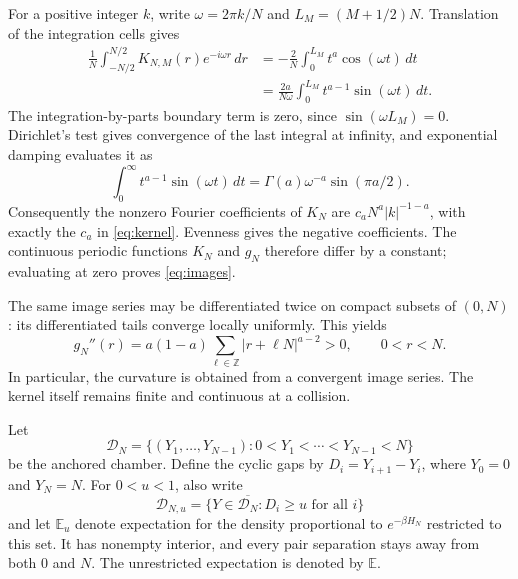 \documentclass[11pt]{article}
\theoremstyle{remark}\newtheorem{remark}[theorem]{Remark}
\newcommand{\E}{\mathbb E}
\newcommand{\Z}{\mathbb Z}
\begin{document}
For a positive integer $k$, write $\omega=2\pi k/N$ and
$L_M=(M+1/2)N$.  Translation of the integration cells gives
\begin{align*}
 \frac1N\int_{-N/2}^{N/2}K_{N,M}(r)e^{-i\omega r}\,dr
 &=-\frac2N\int_0^{L_M}t^a\cos(\omega t)\,dt\\
 &=\frac{2a}{N\omega}
                  \int_0^{L_M}t^{a-1}\sin(\omega t)\,dt.
\end{align*}
The integration-by-parts boundary term is zero, since
$\sin(\omega L_M)=0$.  Dirichlet's test gives convergence of the
last integral at infinity, and exponential damping evaluates it as
\[
 \int_0^\infty t^{a-1}\sin(\omega t)\,dt
       =\Gamma(a)\omega^{-a}\sin(\pi a/2).
\]
Consequently the nonzero Fourier coefficients of $K_N$ are
$c_aN^a|k|^{-1-a}$, with exactly the $c_a$ in \eqref{eq:kernel}.
Evenness gives the negative coefficients.  The continuous periodic
functions $K_N$ and $g_N$ therefore differ by a constant; evaluating
at zero proves \eqref{eq:images}.

The same image series may be differentiated twice on compact
subsets of $(0,N)$: its differentiated tails converge locally
uniformly.  This yields
\begin{equation}\label{eq:curvature}
 g_N''(r)=a(1-a)\sum_{\ell\in\Z}|r+\ell N|^{a-2}>0,
                     \qquad 0<r<N.
\end{equation}
In particular, the curvature is obtained from a convergent image
series.  The kernel itself remains finite and continuous at a
collision.

Let
\[
 \mathcal D_N=\{(Y_1,\ldots,Y_{N-1}):
                     0<Y_1<\cdots<Y_{N-1}<N\}
\]
be the anchored chamber.  Define the cyclic gaps by $D_i=Y_{i+1}-Y_i$, where $Y_0=0$ and
$Y_N=N$.  For $0<u<1$, also write
\[
 \mathcal D_{N,u}=\{Y\in\overline{\mathcal D_N}:
                                      D_i\ge u\text{ for all }i\}
\]
and let $\E_u$ denote expectation for the density proportional to
$e^{-\beta H_N}$ restricted to this set.  It has nonempty interior,
and every pair separation stays away from both $0$ and $N$.
The unrestricted expectation is denoted by $\E$.
\end{document}
